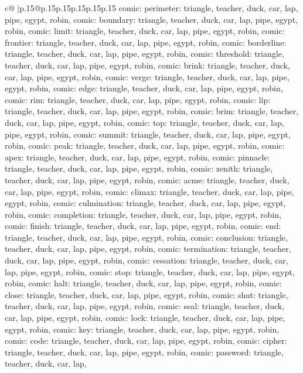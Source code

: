 \documentclass{article}
\begin{document}
{\begin{supertabular}{c@{$\;$}|p{.15\linewidth}@{}p{.15\linewidth}p{.15\linewidth}p{.15\linewidth}p{.15\linewidth}p{.15\linewidth}}
{{{comic\n\nCLUE: perimeter\nTARGETS: triangle, teacher, duck, car, lap, pipe, egypt, robin, comic\n\nCLUE: boundary\nTARGETS: triangle, teacher, duck, car, lap, pipe, egypt, robin, comic\n\nCLUE: limit\nTARGETS: triangle, teacher, duck, car, lap, pipe, egypt, robin, comic\n\nCLUE: frontier\nTARGETS: triangle, teacher, duck, car, lap, pipe, egypt, robin, comic\n\nCLUE: borderline\nTARGETS: triangle, teacher, duck, car, lap, pipe, egypt, robin, comic\n\nCLUE: threshold\nTARGETS: triangle, teacher, duck, car, lap, pipe, egypt, robin, comic\n\nCLUE: brink\nTARGETS: triangle, teacher, duck, car, lap, pipe, egypt, robin, comic\n\nCLUE: verge\nTARGETS: triangle, teacher, duck, car, lap, pipe, egypt, robin, comic\n\nCLUE: edge\nTARGETS: triangle, teacher, duck, car, lap, pipe, egypt, robin, comic\n\nCLUE: rim\nTARGETS: triangle, teacher, duck, car, lap, pipe, egypt, robin, comic\n\nCLUE: lip\nTARGETS: triangle, teacher, duck, car, lap, pipe, egypt, robin, comic\n\nCLUE: brim\nTARGETS: triangle, teacher, duck, car, lap, pipe, egypt, robin, comic\n\nCLUE: top\nTARGETS: triangle, teacher, duck, car, lap, pipe, egypt, robin, comic\n\nCLUE: summit\nTARGETS: triangle, teacher, duck, car, lap, pipe, egypt, robin, comic\n\nCLUE: peak\nTARGETS: triangle, teacher, duck, car, lap, pipe, egypt, robin, comic\n\nCLUE: apex\nTARGETS: triangle, teacher, duck, car, lap, pipe, egypt, robin, comic\n\nCLUE: pinnacle\nTARGETS: triangle, teacher, duck, car, lap, pipe, egypt, robin, comic\n\nCLUE: zenith\nTARGETS: triangle, teacher, duck, car, lap, pipe, egypt, robin, comic\n\nCLUE: acme\nTARGETS: triangle, teacher, duck, car, lap, pipe, egypt, robin, comic\n\nCLUE: climax\nTARGETS: triangle, teacher, duck, car, lap, pipe, egypt, robin, comic\n\nCLUE: culmination\nTARGETS: triangle, teacher, duck, car, lap, pipe, egypt, robin, comic\n\nCLUE: completion\nTARGETS: triangle, teacher, duck, car, lap, pipe, egypt, robin, comic\n\nCLUE: finish\nTARGETS: triangle, teacher, duck, car, lap, pipe, egypt, robin, comic\n\nCLUE: end\nTARGETS: triangle, teacher, duck, car, lap, pipe, egypt, robin, comic\n\nCLUE: conclusion\nTARGETS: triangle, teacher, duck, car, lap, pipe, egypt, robin, comic\n\nCLUE: termination\nTARGETS: triangle, teacher, duck, car, lap, pipe, egypt, robin, comic\n\nCLUE: cessation\nTARGETS: triangle, teacher, duck, car, lap, pipe, egypt, robin, comic\n\nCLUE: stop\nTARGETS: triangle, teacher, duck, car, lap, pipe, egypt, robin, comic\n\nCLUE: halt\nTARGETS: triangle, teacher, duck, car, lap, pipe, egypt, robin, comic\n\nCLUE: close\nTARGETS: triangle, teacher, duck, car, lap, pipe, egypt, robin, comic\n\nCLUE: shut\nTARGETS: triangle, teacher, duck, car, lap, pipe, egypt, robin, comic\n\nCLUE: seal\nTARGETS: triangle, teacher, duck, car, lap, pipe, egypt, robin, comic\n\nCLUE: lock\nTARGETS: triangle, teacher, duck, car, lap, pipe, egypt, robin, comic\n\nCLUE: key\nTARGETS: triangle, teacher, duck, car, lap, pipe, egypt, robin, comic\n\nCLUE: code\nTARGETS: triangle, teacher, duck, car, lap, pipe, egypt, robin, comic\n\nCLUE: cipher\nTARGETS: triangle, teacher, duck, car, lap, pipe, egypt, robin, comic\n\nCLUE: password\nTARGETS: triangle, teacher, duck, car, lap, }}}
\end{supertabular}}
\end{document}
